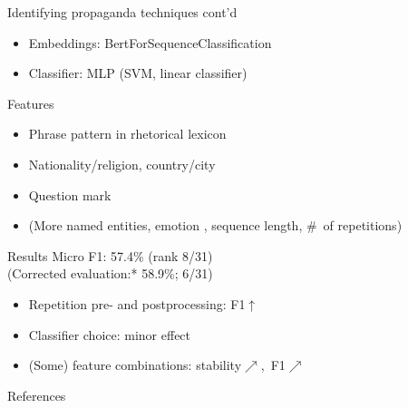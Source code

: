 \documentclass[final]{beamer}
\newlength{\sepwid}
\newlength{\onecolwid}
\newlength{\singlecoltopmargin}
\begin{document}
\begin{frame}[t]
\begin{columns}[t]
\begin{column}{\sepwid}\end{column} %
\begin{column}{\onecolwid}\vspace{\singlecoltopmargin}
\begin{block}{Identifying propaganda techniques cont'd}
\begin{itemize}
    \item Embeddings: BertForSequenceClassification \cite{Wolf2019HuggingFacesTS}\\%
    \item Classifier: MLP (SVM, linear classifier)
\end{itemize}
Features
\begin{itemize}
    \item Phrase pattern in rhetorical lexicon \cite{somasundaran2007detecting}
    \item Nationality/religion, country/city \cite{spacy}
    \item Question mark
    \item (More named entities, emotion \cite{emotion}, sequence length, \#~of repetitions)
\end{itemize}
\begin{alertblock}{Results}
Micro F1: 57.4\% (rank 8/31)\\
(Corrected evaluation:* 58.9\%; 6/31)
\begin{itemize}
    \item Repetition pre- and postprocessing: 
    F1$\uparrow$
    \item Classifier choice: minor effect
    \item (Some) feature combinations: 
    stability$\nearrow$,~F1$\nearrow$
\end{itemize}
\end{alertblock}
\end{block}

\vspace{-2em}
\begin{block}{References}
\small{
\vspace{0.75in}}
\end{block}



\end{column}
\end{columns}
\end{frame}
\end{document}
